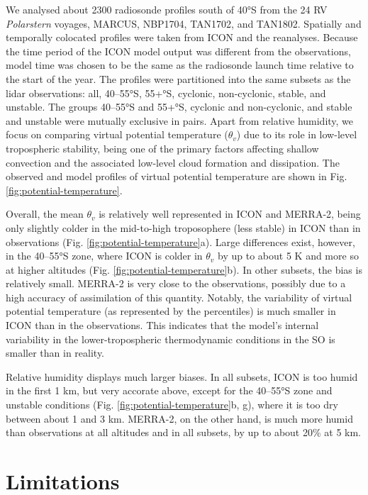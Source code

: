 \documentclass[12pt,a4paper]{article}
\begin{document}
We analysed about 2300 radiosonde profiles south of 40°S from the 24 RV
\emph{Polarstern} voyages, MARCUS, NBP1704, TAN1702, and TAN1802. Spatially and
temporally colocated profiles were taken from ICON and the reanalyses. Because
the time period of the ICON model output was different from the observations,
model time was chosen to be the same as the radiosonde launch time relative to
the start of the year. The profiles were partitioned into the same subsets as
the lidar observations: all, 40--55°S, 55+°S, cyclonic, non-cyclonic, stable,
and unstable. The groups 40--55°S and 55+°S, cyclonic and non-cyclonic, and
stable and unstable were mutually exclusive in pairs. Apart from relative
humidity, we focus on comparing virtual potential temperature ($\theta_v$) due
to its role in low-level tropospheric stability, being one of the primary
factors affecting shallow convection and the associated low-level cloud
formation and dissipation. The observed and model profiles of virtual potential
temperature are shown in Fig. \ref{fig:potential-temperature}.

Overall, the mean $\theta_v$ is relatively well represented in ICON and
MERRA-2, being only slightly colder in the mid-to-high troposophere (less
stable) in ICON than in observations (Fig. \ref{fig:potential-temperature}a).
Large differences exist, however, in the 40--55°S zone, where ICON is colder in
$\theta_v$ by up to about 5 K and more so at higher altitudes (Fig.
\ref{fig:potential-temperature}b). In other subsets, the bias is relatively
small. MERRA-2 is very close to the observations, possibly due to a high
accuracy of assimilation of this quantity. Notably, the variability of virtual
potential temperature (as represented by the percentiles) is much smaller in
ICON than in the observations. This indicates that the model's internal
variability in the lower-tropospheric thermodynamic conditions in the SO is
smaller than in reality.

Relative humidity displays much larger biases. In all subsets, ICON is too
humid in the first 1 km, but very accorate above, except for the 40--55°S zone
and unstable conditions (Fig. \ref{fig:potential-temperature}b, g),  where it
is too dry between about 1 and 3 km. MERRA-2, on the other hand, is much more
humid than observations at all altitudes and in all subsets, by up to about
20\% at 5 km.

\section{Limitations}
\end{document}
